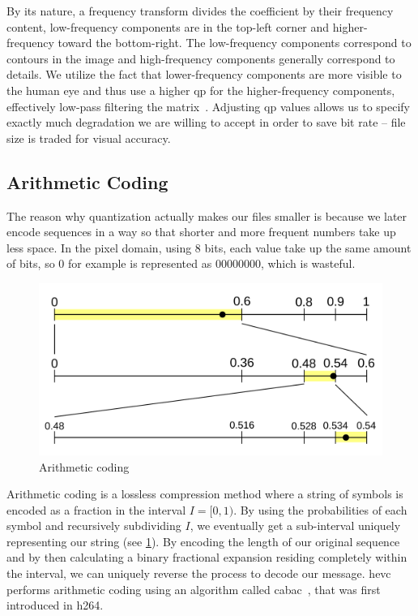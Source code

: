 By its nature, a frequency transform divides the coefficient by their frequency content, low-frequency components are in the top-left corner and higher-frequency toward the bottom-right. The low-frequency components correspond to contours in the image and high-frequency components generally correspond to details. We utilize the fact that lower-frequency components are more visible to the human eye and thus use a higher \gls{qp} for the higher-frequency components, effectively low-pass filtering the matrix~\cite{Sauer}. Adjusting \gls{qp} values allows us to specify exactly much degradation we are willing to accept in order to save bit rate -- file size is traded for visual accuracy.

\subsection{Arithmetic Coding}
\label{subsec:arithmetic-coding}
The reason why quantization actually makes our files smaller is because we later encode sequences in a way so that shorter and more frequent numbers take up less space. In the pixel domain, using 8 bits, each value take up the same amount of bits, so 0 for example is represented as 00000000, which is wasteful.

\begin{figure}
    \centering
    \includegraphics[scale=0.3]{pictures/wikipedia/Arithmetic_encoding}
    \caption{Arithmetic coding}
    \label{fig:cabac}
\end{figure}

Arithmetic coding is a lossless compression method where a string of symbols is encoded as a fraction in the interval $I=[0,1)$. By using the probabilities of each symbol and recursively subdividing $I$, we eventually get a sub-interval uniquely representing our string (see \cref{fig:cabac}). By encoding the length of our original sequence and by then calculating a binary fractional expansion residing completely within the interval, we can uniquely reverse the process to decode our message. \gls{hevc} performs arithmetic coding using an algorithm called \gls{cabac}~\cite{Vcodex_HEVC_introduction}, that was first introduced in \gls{h264}.

